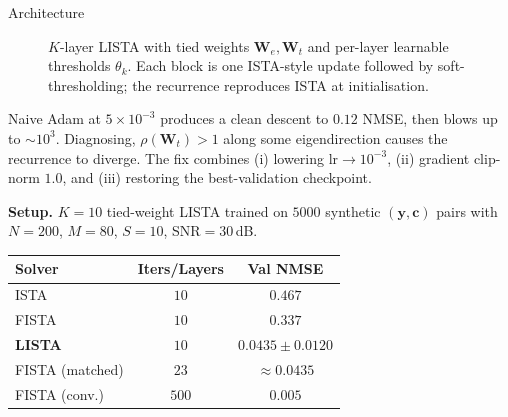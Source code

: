 \documentclass[final]{beamer}
\newlength{\colwidth}
\begin{document}
\begin{frame}[t]
\begin{columns}[t]
\begin{column}{\colwidth}
\begin{block}{Architecture}
\begin{figure}
          \caption{$K$-layer LISTA with tied weights
            $\boldsymbol{W}_e,\boldsymbol{W}_t$ and per-layer learnable
            thresholds $\theta_k$. Each block is one ISTA-style update
            followed by soft-thresholding; the recurrence reproduces
          ISTA at initialisation.}
        \end{figure}

        Naive Adam at $5{\times}10^{-3}$ produces a clean descent to
        $0.12$ NMSE, then blows up to $\sim\!10^3$. Diagnosing,
        $\rho(\boldsymbol{W}_t){>}1$ along some eigendirection causes the
        recurrence to diverge. The fix combines (i) lowering
        lr$\to\!10^{-3}$, (ii) gradient clip-norm $1.0$, and
        (iii) restoring the best-validation checkpoint.

        \textbf{Setup.} $K{=}10$ tied-weight LISTA trained on $5000$
        synthetic $(\boldsymbol{y},\boldsymbol{c})$ pairs with
        $N{=}200$, $M{=}80$, $S{=}10$, SNR${=}30$\,dB.

        \medskip
        \centering\small
        \renewcommand{\arraystretch}{1.18}
        \begin{tabular}{@{}l c c@{}}
          \toprule
          \textbf{Solver} & \textbf{Iters/Layers} & \textbf{Val NMSE} \\
          \midrule
          ISTA   & $10$  & $0.467$ \\
          FISTA  & $10$  & $0.337$ \\
          \textbf{LISTA}  & $10$  & $\mathbf{0.0435{\pm}0.0120}$ \\
          \midrule
          FISTA (matched) & $23$  & $\approx 0.0435$ \\
          FISTA (conv.)   & $500$ & $0.005$ \\
          \bottomrule
        \end{tabular}


\end{block}
\end{column}
\end{columns}
\end{frame}
\end{document}
